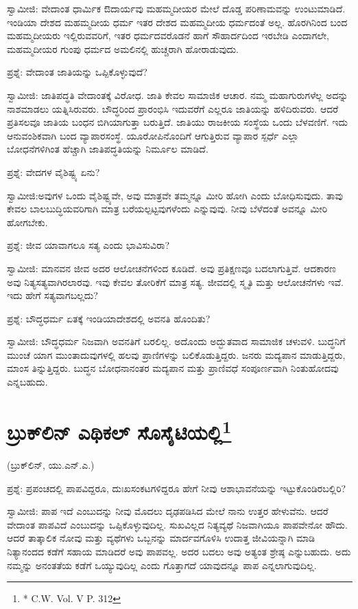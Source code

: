 ಸ್ವಾಮೀಜಿ: ವೇದಾಂತ ಧಾರ್ಮಿಕ ಔದಾರ್ಯವು ಮಹಮ್ಮದೀಯರ ಮೇಲೆ ದೊಡ್ಡ ಪರಿಣಾಮವನ್ನು ಉಂಟುಮಾಡಿದೆ. ಇಂಡಿಯಾ ದೇಶದ ಮಹಮ್ಮದೀಯ ಧರ್ಮ ಇತರ ದೇಶದ ಮಹಮ್ಮದೀಯ ಧರ್ಮದಂತೆ ಅಲ್ಲ. ಹೊರಗಿನಿಂದ ಬಂದ ಮಹಮ್ಮದೀಯರು ಇಲ್ಲಿರುವವರಿಗೆ, ಇತರ ಧರ್ಮದವರೊಡನೆ ಹಾಗೆ ಸೌಹಾರ್ದದಿಂದ ಇರಬೇಡಿ ಎಂದಾಗಲೇ, ಮಹಮ್ಮದೀಯರ ಗುಂಪು ಧರ್ಮದ ಅಮಲಿನಲ್ಲಿ ಹುಚ್ಚರಾಗಿ ಹೋರಾಡುವುದು.

ಪ್ರಶ್ನೆ: ವೇದಾಂತ ಜಾತಿಯನ್ನು ಒಪ್ಪಿಕೊಳ್ಳುವುದೆ?

ಸ್ವಾಮೀಜಿ: ಜಾತಿಪದ್ಧತಿ ವೇದಾಂತಕ್ಕೆ ವಿರೋಧ. ಜಾತಿ ಕೇವಲ ಸಾಮಾಜಿಕ ಆಚಾರ. ನಮ್ಮ ಮಹಾಗುರುಗಳೆಲ್ಲ ಅದನ್ನು ನಾಶಮಾಡಲು ಯತ್ನಿಸಿರುವರು. ಬೌದ್ಧರಿಂದ ಪ್ರಾರಂಭಿಸಿ ಇದುವರೆಗೆ ಎಲ್ಲರೂ ಜಾತಿಯನ್ನು ಹಳಿದಿರುವರು. ಆದರೆ ಪ್ರತಿಸಲವೂ ಜಾತಿಯ ಬಂಧನ ಬಿಗಿಯಾಗುತ್ತಾ ಬರುತ್ತಿದೆ. ಜಾತಿಯು ರಾಜಕೀಯ ಸಂಸ್ಥೆಯ ಒಂದು ಬೆಳವಣಿಗೆ. ಇದು ಆನುವಂಶಿಕವಾಗಿ ಬಂದ ವ್ಯಾಪಾರಸಂಸ್ಥೆ. ಯೂರೋಪಿನೊಂದಿಗೆ ಆಗುತ್ತಿರುವ ವ್ಯಾಪಾರ ಸ್ಪರ್ಧೆ ಎಲ್ಲಾ ಬೋಧನೆಗಳಿಗಿಂತ ಹೆಚ್ಚಾಗಿ ಜಾತಿಪದ್ಧತಿಯನ್ನು ನಿರ್ಮೂಲ ಮಾಡಿದೆ.

ಪ್ರಶ್ನೆ: ವೇದಗಳ ವೈಶಿಷ್ಟ್ಯ ಏನು?

ಸ್ವಾಮೀಜಿ:ಅವುಗಳ ಒಂದು ವೈಶಿಷ್ಟ್ಯವೇ, ಅವು ಮಾತ್ರವೇ ತಮ್ಮನ್ನೂ ಮೀರಿ ಹೋಗಿ ಎಂದು ಬೋಧಿಸುವುದು. ತಾವು ಕೇವಲ ಬಾಲಬುದ್ಧಿಯವರಿಗಾಗಿ ಮಾತ್ರ ಬರೆಯಲ್ಪಟ್ಟವುಗಳೆಂದು ಎನ್ನುವುವು. ನೀವು ಬೆಳೆದಂತೆ ಅವನ್ನೂ ಮೀರಿ ಹೋಗಬೇಕು.

ಪ್ರಶ್ನೆ: ಜೀವ ಯಾವಾಗಲೂ ಸತ್ಯ ಎಂದು ಭಾವಿಸುವಿರಾ?

ಸ್ವಾಮೀಜಿ: ಮಾನವನ ಜೀವ ಅದರ ಆಲೋಚನೆಗಳಿಂದ ಕೂಡಿದೆ. ಅವು ಪ್ರತಿಕ್ಷಣವೂ ಬದಲಾಗುತ್ತಿವೆ. ಆದಕಾರಣ ಅವು ನಿತ್ಯಸತ್ಯವಾಗಿರಲಾರವು. ಇವು ಕೇವಲ ತೋರಿಕೆಗೆ ಮಾತ್ರ ಸತ್ಯ. ಜೀವದಲ್ಲಿ ಸ್ಮೃತಿ ಮತ್ತು ಆಲೋಚನೆಗಳು ಇವೆ. ಇದು ಹೇಗೆ ಸತ್ಯವಾಗಬಲ್ಲದು?

ಪ್ರಶ್ನೆ: ಬೌದ್ಧಧರ್ಮ ಏತಕ್ಕೆ ಇಂಡಿಯಾದೇಶದಲ್ಲಿ ಅವನತಿ ಹೊಂದಿತು?

ಸ್ವಾಮೀಜಿ: ಬೌದ್ಧಧರ್ಮ ನಿಜವಾಗಿ ಅವನತಿಗೆ ಬರಲಿಲ್ಲ. ಅದೊಂದು ಅದ್ಭುತವಾದ ಸಾಮಾಜಿಕ ಚಳುವಳಿ. ಬುದ್ಧನಿಗೆ ಮುಂಚೆ ಯಾಗ ಮುಂತಾದುವುಗಳಲ್ಲಿ ಹಲವು ಪ್ರಾಣಿಗಳನ್ನು ಬಲಿಕೊಡುತ್ತಿದ್ದರು. ಜನರು ಮದ್ಯಪಾನ ಮಾಡುತ್ತಿದ್ದರು, ಮಾಂಸ ತಿನ್ನುತ್ತಿದ್ದರು. ಬುದ್ಧನ ಬೋಧನಾನಂತರ ಮದ್ಯಪಾನ ಮತ್ತು ಪ್ರಾಣಿವಧೆ ಸಂಪೂರ್ಣವಾಗಿ ನಿಂತುಹೋದವು ಎನ್ನಬಹುದು.


\section[ಬ್ರುಕ್‍ಲಿನ್ ಎಥಿಕಲ್ ಸೊಸೈಟಿಯಲ್ಲಿ]{ಬ್ರುಕ್‍ಲಿನ್ ಎಥಿಕಲ್ ಸೊಸೈಟಿಯಲ್ಲಿ\protect\footnote{* C.W. Vol. V P. 312}}

\begin{center}
(ಬ್ರುಕ್​ಲಿನ್​, ಯು.ಎನ್​.ಎ.)
\end{center}

ಪ್ರಶ್ನೆ: ಪ್ರಪಂಚದಲ್ಲಿ ಪಾಪವಿದ್ದರೂ, ದುಃಖಸಂಕಟಗಳಿದ್ದರೂ ಹೇಗೆ ನೀವು ಆಶಾಭಾವನೆಯನ್ನು ಇಟ್ಟುಕೊಂಡಿರಬಲ್ಲಿರಿ?

ಸ್ವಾಮೀಜಿ: ಪಾಪ ಇದೆ ಎಂಬುದನ್ನು ನೀವು ಮೊದಲು ದೃಢಪಡಿಸಿದ ಮೇಲೆ ನಾನು ಉತ್ತರ ಹೇಳುವೆನು. ಆದರೆ ವೇದಾಂತ ಪಾಪವಿದೆ ಎಂಬುದನ್ನು ಒಪ್ಪಿಕೊಳ್ಳುವುದಿಲ್ಲ. ಸುಖವಿಲ್ಲದ ನಿತ್ಯವ್ಯಥೆ ನಿಜವಾಗಿಯೂ ಪಾಪವೇನೋ ಹೌದು. ಆದರೆ ತಾತ್ಕಾಲಿಕ ನೋವು ಮತ್ತು ವ್ಯಥೆಗಳು ಒಬ್ಬನನ್ನು ಮಾರ್ದವಗೊಳಿಸಿ ಉದಾತ್ತ ಜೀವಿಯನ್ನಾಗಿ ಮಾಡಿ ನಿತ್ಯಾನಂದದ ಕಡೆಗೆ ಸಹಾಯ ಮಾಡಿದರೆ ಅವು ಪಾಪವಲ್ಲ. ಅದರ ಬದಲು ಅವು ಅತ್ಯಂತ ಶ್ರೇಷ್ಠ ಎನ್ನುಬಹುದು. ಅದು ನಮ್ಮನ್ನು ಅನಂತತೆಯ ಕಡೆಗೆ ಒಯ್ಯುವುದಿಲ್ಲ ಎಂದು ಗೊತ್ತಾಗದೆ ಯಾವುದನ್ನೂ ಪಾಪ ಎನ್ನಲಾಗುವುದಿಲ್ಲ.


